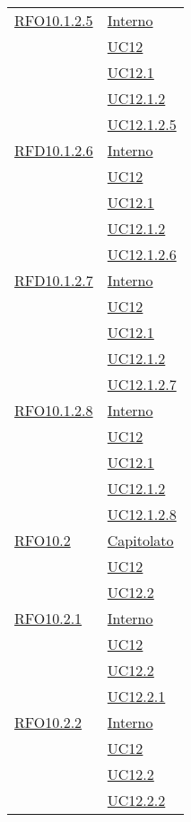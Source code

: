 \begin{longtable}{|>{\centering}m{5cm}|m{5cm}<{\centering}|}
 \hyperlink{RFO10.1.2.5}{RFO10.1.2.5} 
 & \hyperlink{Interno}{Interno}\\
& \hyperref[UC12]{UC12}\\
& \hyperref[UC12.1]{UC12.1}\\
& \hyperref[UC12.1.2]{UC12.1.2}\\
& \hyperref[UC12.1.2.5]{UC12.1.2.5}\\\hline

 \hyperlink{RFD10.1.2.6}{RFD10.1.2.6} 
 & \hyperlink{Interno}{Interno}\\
& \hyperref[UC12]{UC12}\\
& \hyperref[UC12.1]{UC12.1}\\
& \hyperref[UC12.1.2]{UC12.1.2}\\
& \hyperref[UC12.1.2.6]{UC12.1.2.6}\\\hline

 \hyperlink{RFD10.1.2.7}{RFD10.1.2.7} 
 & \hyperlink{Interno}{Interno}\\
& \hyperref[UC12]{UC12}\\
& \hyperref[UC12.1]{UC12.1}\\
& \hyperref[UC12.1.2]{UC12.1.2}\\
& \hyperref[UC12.1.2.7]{UC12.1.2.7}\\\hline

\hyperlink{RFO10.1.2.8}{RFO10.1.2.8} 
 & \hyperlink{Interno}{Interno}\\
& \hyperref[UC12]{UC12}\\
& \hyperref[UC12.1]{UC12.1}\\
& \hyperref[UC12.1.2]{UC12.1.2}\\
& \hyperref[UC12.1.2.8]{UC12.1.2.8}\\\hline

 \hyperlink{RFO10.2}{RFO10.2} 
 & \hyperlink{Capitolato}{Capitolato}\\\
& \hyperref[UC12]{UC12}\\
& \hyperref[UC12.2]{UC12.2}\\\hline

 \hyperlink{RFO10.2.1}{RFO10.2.1} 
 & \hyperlink{Interno}{Interno}\\
& \hyperref[UC12]{UC12}\\
& \hyperref[UC12.2]{UC12.2}\\
& \hyperref[UC12.2.1]{UC12.2.1}\\\hline

 \hyperlink{RFO10.2.2}{RFO10.2.2} 
 & \hyperlink{Interno}{Interno}\\
& \hyperref[UC12]{UC12}\\
& \hyperref[UC12.2]{UC12.2}\\
& \hyperref[UC12.2.2]{UC12.2.2}\\\hline


\end{longtable}
